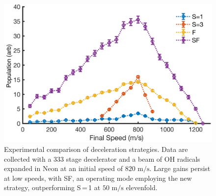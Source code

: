 \documentclass[%
 reprint,
 amsmath,amssymb,
 aps,
prl,
]{revtex4-1}
\begin{document}
\begin{figure}[t]
\includegraphics[width=\linewidth]{Data/Data-Figure-Final-Speed.png}%
\vspace{-5pt}
\caption{\label{fig:alldata}
Experimental comparison of deceleration strategies. 
Data are collected with a $333$ stage decelerator and a beam of OH radicals expanded in Neon at an initial speed of $820\text{ m/s}$. 
Large gains persist at low speeds, with SF, an operating mode employing the new strategy, outperforming S\,=\,1 at $50\text{ m/s}$ elevenfold.
\vspace{-4mm}
}
\end{figure}
\end{document}
